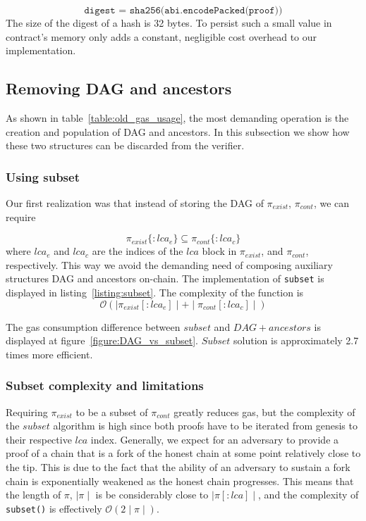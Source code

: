 \[\texttt{digest = sha256(abi.encodePacked(proof))}\] The size of the digest of
a hash is 32 bytes. To persist such a small value in contract's memory only
adds a constant, negligible cost overhead to our implementation.



\subsection{Removing DAG and ancestors}

As shown in table~\ref{table:old_gas_usage}, the most demanding operation is
the creation and population of DAG and ancestors. In this subsection we show
how these two structures can be discarded from the verifier.

\subsubsection{Using subset} Our first realization was that instead of storing the
DAG of $\pi_{exist}$, $\pi_{cont}$, we can require

\[ \pi_{exist}\{:lca_{e}\} \subseteq \pi_{cont}\{:lca_{c}\} \]
where $lca_{e}$ and $lca_{c}$ are the indices of the $lca$ block in
$\pi_{exist}$, and $\pi_{cont}$, respectively. This way we avoid
the demanding need of composing auxiliary structures DAG and ancestors
on-chain. The implementation of \texttt{subset} is displayed in
listing~\ref{listing:subset}. The complexity of the function is
\[ \mathcal{O}(\mid\pi_{exist}[:lca_{e}]\mid + \mid\pi_{cont}[:lca_{c}]\mid) \]





The gas consumption difference between $subset$ and $DAG + ancestors$ is
displayed at figure~\ref{figure:DAG_vs_subset}. $Subset$ solution is
approximately 2.7 times more efficient.



\subsubsection{Subset complexity and limitations} Requiring $\pi_{exist}$ to be a subset of
$\pi_{cont}$ greatly reduces gas, but the complexity of the $subset$ algorithm
is high since both proofs have to be iterated from genesis to their respective
$lca$ index. Generally, we expect for an adversary to provide a proof of a
chain that is a fork of the honest chain at some point relatively close to the
tip. This is due to the fact that the ability of an adversary to sustain a fork
chain is exponentially weakened as the honest chain progresses.  This means
that the length of $\pi$, $\mid\pi\mid$ is be considerably close to
$\mid\pi[:lca]\mid$, and the complexity of \texttt{subset()} is effectively
$\mathcal{O}(2\mid\pi\mid)$.

